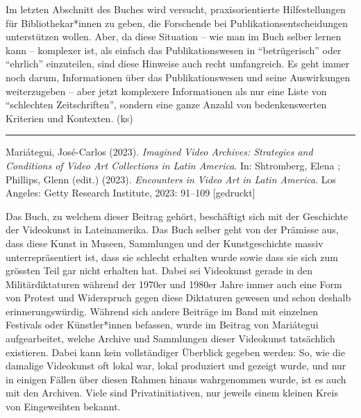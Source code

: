 \documentclass[a4paper,
fontsize=11pt,
oneside,
numbers=noperiodatend,
parskip=half-,
bibliography=totoc,
final
]{scrartcl}
\begin{document}
Im letzten Abschnitt des Buches wird versucht, praxisorientierte
Hilfestellungen für Bibliothekar*innen zu geben, die Forschende bei
Publikationsentscheidungen unterstützen wollen. Aber, da diese Situation
-- wie man im Buch selber lernen kann -- komplexer ist, als einfach das
Publikationswesen in \enquote{betrügerisch} oder \enquote{ehrlich}
einzuteilen, sind diese Hinweise auch recht umfangreich. Es geht immer
noch darum, Informationen über das Publikationswesen und seine
Auswirkungen weiterzugeben -- aber jetzt komplexere Informationen als
nur eine Liste von \enquote{schlechten Zeitschriften}, sondern eine
ganze Anzahl von bedenkenswerten Kriterien und Kontexten. (ks)

\begin{center}\rule{0.5\linewidth}{0.5pt}\end{center}

Mariátegui, José-Carlos (2023). \emph{Imagined Video Archives:
Strategies and Conditions of Video Art Collections in Latin America}.
In: Shtromberg, Elena ; Phillips, Glenn (edit.) (2023). \emph{Encounters
in Video Art in Latin America}. Los Angeles: Getty Research Institute,
2023: 91--109 {[}gedruckt{]}

Das Buch, zu welchem dieser Beitrag gehört, beschäftigt sich mit der
Geschichte der Videokunst in Lateinamerika. Das Buch selber geht von der
Prämisse aus, dass diese Kunst in Museen, Sammlungen und der
Kunstgeschichte massiv unterrepräsentiert ist, dass sie schlecht
erhalten wurde sowie dass sie sich zum grössten Teil gar nicht erhalten
hat. Dabei sei Videokunst gerade in den Militärdiktaturen während der
1970er und 1980er Jahre immer auch eine Form von Protest und Widerspruch
gegen diese Diktaturen gewesen und schon deshalb erinnerungswürdig.
Während sich andere Beiträge im Band mit einzelnen Festivals oder
Künstler*innen befassen, wurde im Beitrag von Mariátegui aufgearbeitet,
welche Archive und Sammlungen dieser Videokunst tatsächlich existieren.
Dabei kann kein vollständiger Überblick gegeben werden: So, wie die
damalige Videokunst oft lokal war, lokal produziert und gezeigt wurde,
und nur in einigen Fällen über diesen Rahmen hinaus wahrgenommen wurde,
ist es auch mit den Archiven. Viele sind Privatinitiativen, nur jeweils
einem kleinen Kreis von Eingeweihten bekannt.
\end{document}
